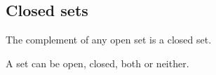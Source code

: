 
\subsection{Closed sets}

The complement of any open set is a closed set.

A set can be open, closed, both or neither.

